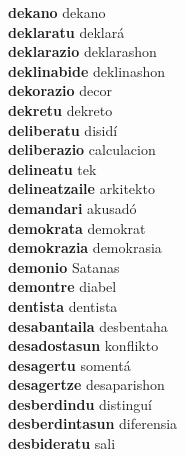 \textbf{dekano } dekano \\
\textbf{deklaratu } deklará \\
\textbf{deklarazio } deklarashon \\
\textbf{deklinabide } deklinashon \\
\textbf{dekorazio } decor \\
\textbf{dekretu } dekreto \\
\textbf{deliberatu } disidí \\
\textbf{deliberazio } calculacion \\
\textbf{delineatu } tek \\
\textbf{delineatzaile } arkitekto \\
\textbf{demandari } akusadó \\
\textbf{demokrata } demokrat \\
\textbf{demokrazia } demokrasia \\
\textbf{demonio } Satanas \\
\textbf{demontre } diabel \\
\textbf{dentista } dentista \\
\textbf{desabantaila } desbentaha \\
\textbf{desadostasun } konflikto \\
\textbf{desagertu } somentá \\
\textbf{desagertze } desaparishon \\
\textbf{desberdindu } distinguí \\
\textbf{desberdintasun } diferensia \\
\textbf{desbideratu } sali \\
